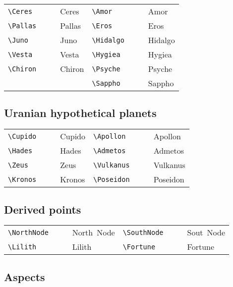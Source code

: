 \documentclass{article}
\newcommand{\showboth}[1]{\starfontsans #1 & \starfontserif #1}
\begin{document}
\begin{tabular}{llll|llll}
\verb|\Ceres| & \showboth{\Ceres} & Ceres &
   \verb|\Amor| & \showboth{\Amor} & Amor \\
\verb|\Pallas| & \showboth{\Pallas} & Pallas &
   \verb|\Eros| & \showboth{\Eros} & Eros \\
\verb|\Juno| & \showboth{\Juno} & Juno &
   \verb|\Hidalgo| & \showboth{\Hidalgo} & Hidalgo \\
\verb|\Vesta| & \showboth{\Vesta} & Vesta &
   \verb|\Hygiea| & \showboth{\Hygiea} & Hygiea \\
\verb|\Chiron| & \showboth{\Chiron} & Chiron &
   \verb|\Psyche| & \showboth{\Psyche} & Psyche \\
& & & & \verb|\Sappho| & \showboth{\Sappho} & Sappho
\end{tabular}

\subsection{Uranian hypothetical planets}

\begin{tabular}{llll|llll}
\verb|\Cupido| & \showboth{\Cupido} & Cupido &
   \verb|\Apollon| & \showboth{\Apollon} & Apollon \\
\verb|\Hades| & \showboth{\Hades} & Hades &
   \verb|\Admetos| & \showboth{\Admetos} & Admetos \\
\verb|\Zeus| & \showboth{\Zeus} & Zeus &
   \verb|\Vulkanus| & \showboth{\Vulkanus} & Vulkanus \\
\verb|\Kronos| & \showboth{\Kronos} & Kronos &
   \verb|\Poseidon| & \showboth{\Poseidon} & Poseidon
\end{tabular}

\subsection{Derived points}

\begin{tabular}{llll|llll}
\verb|\NorthNode| & \showboth{\NorthNode} & North~Node &
   \verb|\SouthNode| & \showboth{\SouthNode} & Sout~Node \\
\verb|\Lilith| & \showboth{\Lilith} & Lilith &
   \verb|\Fortune| & \showboth{\Fortune} & Fortune
\end{tabular}

\subsection{Aspects}
\end{document}
